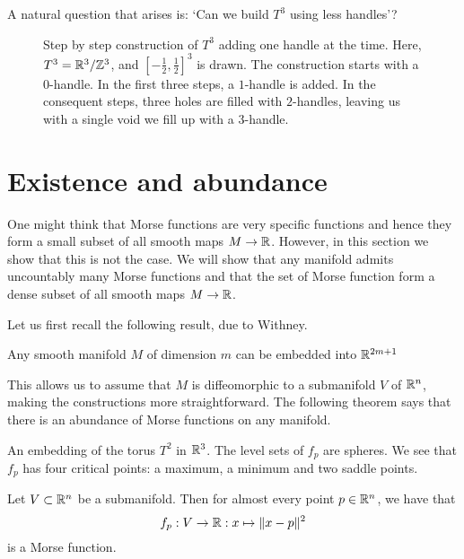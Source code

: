 \begin{eg}[$T^{3} = S^{1} \times S^{1} \times S^{2}$]
    A natural question that arises is: `Can we build $T^{3}$ using less handles'?


    \begin{figure}[H]
    \centering
    \caption{
        Step by step construction of $T^{3}$ adding one handle at the time.
        Here, $T^{3} = \mathbb{R}^3/ \mathbb{Z}^3$, and $\left[-\frac{1}{2}, \frac{1}{2}\right]^3$ is drawn.
        The construction starts with a $0$-handle.
        In the first three steps, a $1$-handle is added.
        In the consequent steps,
        three holes are filled with $2$-handles,
        leaving us with a single void we fill up with a $3$-handle.
    }
    \label{fig:three-torus-handle-decomposition}
\end{figure}
\end{eg}




\section{Existence and abundance}
One might think that Morse functions are very specific functions and hence they form a small subset of all smooth maps $M \to  \mathbb{R}$.
However, in this section we show that this is not the case. We will show that any manifold admits uncountably many Morse functions and that the set of Morse function form a dense subset of all smooth maps $M \to  \mathbb{R}$.

Let us first recall the following result, due to Withney\cite{todo}.
\begin{theorem}
    Any smooth manifold $M$ of dimension $m$ can be embedded into  $\mathbb{R}^{2m+1}$
\end{theorem}
This allows us to assume that $M$ is diffeomorphic to a submanifold $V$ of $\mathbb{R}^{n}$, making the constructions  more straightforward.
The following theorem says that there is an abundance of Morse functions on any manifold.
\begin{marginfigure}
    \centering
    \caption{An embedding of the torus $T^2$ in $\mathbb{R}^3$. The level sets of $f_p$ are spheres. We see that $f_p$ has four critical points: a maximum, a minimum and two saddle points.}
    \label{fig:level-sets-of-distance-function-torus}
\end{marginfigure}
\begin{prop}
    Let $V \subset \mathbb{R}^{n}$ be a submanifold.
    Then for almost every point $p \in \mathbb{R}^{n}$, we have that
    \[
    f_p : V \to \mathbb{R}: x \mapsto  \|x - p\|^2
    \] 
    is a Morse function.
\end{prop}


